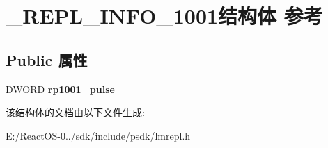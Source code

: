 \hypertarget{struct___r_e_p_l___i_n_f_o__1001}{}\section{\+\_\+\+R\+E\+P\+L\+\_\+\+I\+N\+F\+O\+\_\+1001结构体 参考}
\label{struct___r_e_p_l___i_n_f_o__1001}
\subsection*{Public 属性}
\begin{DoxyCompactItemize}
\item 
\mbox{\label{struct___r_e_p_l___i_n_f_o__1001_ae85542b3ae331b15d6c3f84ddd13a5dc}} 
D\+W\+O\+RD {\bfseries rp1001\+\_\+pulse}
\end{DoxyCompactItemize}


该结构体的文档由以下文件生成\+:\begin{DoxyCompactItemize}
\item 
E\+:/\+React\+O\+S-\/0../sdk/include/psdk/lmrepl.\+h\end{DoxyCompactItemize}
